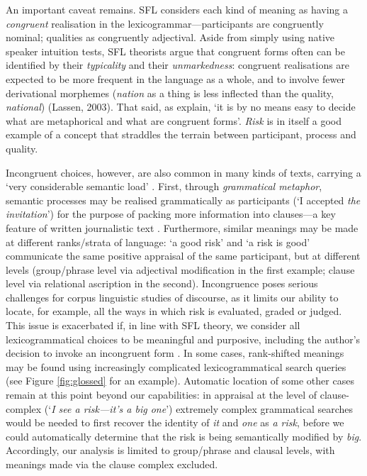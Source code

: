 		An important caveat remains. SFL considers each kind of meaning as having a \emph{congruent} realisation in the lexicogrammar---participants are congruently nominal; qualities as congruently adjectival. Aside from simply using native speaker intuition tests, SFL theorists argue that congruent forms often can be identified by their \emph{typicality} and their \emph{unmarkedness}: congruent realisations are expected to be more frequent in the language as a whole, and to involve fewer derivational morphemes (\emph{nation} as a thing is less inflected than the quality, \emph{national}) (Lassen, 2003). That said, as  explain, `it is by no means easy to decide what are metaphorical and what are congruent forms'. \emph{Risk} is in itself a good example of a concept that straddles the terrain between participant, process and quality.


		Incongruent choices, however, are also common in many kinds of texts, carrying a `very considerable semantic load' \cite[p.~?]{halliday_introduction_2004}. First, through \emph{grammatical metaphor}, semantic processes may be realised grammatically as participants (`I accepted \emph{the invitation}') for the purpose of packing more information into clauses---a key feature of written journalistic text \cite{simon-vandenbergen_grammatical_2003}. Furthermore, similar meanings may be made at different ranks/strata of language: `a good risk' and `a risk is good' communicate the same positive appraisal of the same participant, but at different levels (group/phrase level via adjectival modification in the first example; clause level via relational ascription in the second). Incongruence poses serious challenges for corpus linguistic studies of discourse, as it limits our ability to locate, for example, all the ways in which risk is evaluated, graded or judged. This issue is exacerbated if, in line with SFL theory, we consider all lexicogrammatical choices to be meaningful and purposive, including the author's decision to invoke an incongruent form \cite<as in>{eggins_introduction_2004}. In some cases, rank-shifted meanings may be found using increasingly complicated lexicogrammatical search queries (see Figure \ref{fig:glossed} for an example). Automatic location of some other cases remain at this point beyond our capabilities: in appraisal at the level of clause-complex (`\emph{I see a risk---it's a big one}') extremely complex grammatical searches would be needed to first recover the identity of \emph{it} and \emph{one} as \emph{a risk}, before we could automatically determine that the risk is being semantically modified by \emph{big}. Accordingly, our analysis is limited to group/phrase and clausal levels, with meanings made via the clause complex excluded.

